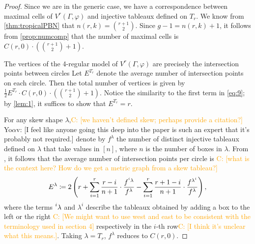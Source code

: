 \documentclass[11pt,reqno]{amsart}
\newcommand{\yoav}[1]{{\color{blue} \sf  Yo$\alpha$v: [#1]}}
\newcommand{\derek}[1]{{\color{Green} \sf D: [#1]}}
\newcommand{\caelan}[1]{\textcolor{orange}{\sf C: [#1]}}
\theoremstyle{definition}
\theoremstyle{problem}
\theoremstyle{plain}
\theoremstyle{remark}
\theoremstyle{theorem}
\numberwithin{equation}{section}
\numberwithin{figure}{section}
\begin{document}
\begin{proof}
  Since we are in the generic case, we have a correspondence between maximal cells
  of $V^r(\Gamma,\varphi)$ and injective tableaux defined on $T_r$.
  We know from \cref{thm:tropicalPBN} that $n(r,k) = \binom{r+1}{2}$.
  Since $g - 1 = n(r,k) + 1$, it follows from \cref{prop:numcomp}  that the
  number of maximal cells is
  $C(r,0) \cdot \left(\binom{r+1}{2}+1\right)$.

  The vertices of the 4-regular model of $V^r(\Gamma,\varphi)$ are
  precisely the intersection points between circles 
  Let $E^{T_r}$ denote the average number of intersection
  points on each circle.  Then the total number of vertices is given
  by $\frac{1}{2} E^{T_r} \cdot C(r,0) \cdot (\binom{r+1}{2}+1)$.
  Notice the similarity to the first term in \cref{eq:9}; by
  \cref{lem:1}, it suffices to show that $E^{T_r} = r$.
  
  For any skew shape $\lambda$,\caelan{we haven't defined skew;
    perhaps provide a citation?} \yoav{I feel like anyone going this deep into the paper is such an expert that it's probably not required.}
    denote by $f^\lambda$ the number of
  distinct injective tableaux defined on $\lambda$ that take values in
  $[n]$, where $n$ is the number of boxes in $\lambda$.  From
  \cite[Theorem~2.9]{chan2018genera}, it follows that the average
  number of intersection points per circle is \caelan{what is the
    context here?  How do we get a metric graph from a skew tableau?}
  \begin{equation}\label{eq:11}
    E^{\lambda} \coloneq 2\left(r+\sum_{i=1}^{r}\frac{r-i}{n+1} \cdot
      \frac{f^{\prescript{i}{}{\lambda}}}{f^{\lambda}}
      -\sum_{i=1}^{r}\frac{r+1-i}{n+1} \cdot
      \frac{f^{\lambda^{i}}}{f^{\lambda}}\right),
  \end{equation}
  where the terms $\prescript{i}{}{\lambda}$ and $\lambda^{i}$
  describe the tableaux obtained by adding a box to the left or the
  right \caelan{We might want to use west and east to be consistent
    with the terminology used in section 4} respectively in the $i$-th
  row\caelan{I think it's unclear what this means.}.  Taking
  $\lambda = T_r$, $f^{\lambda}$ reduces to $C(r,0)$.
  
	

\end{proof}
\end{document}
